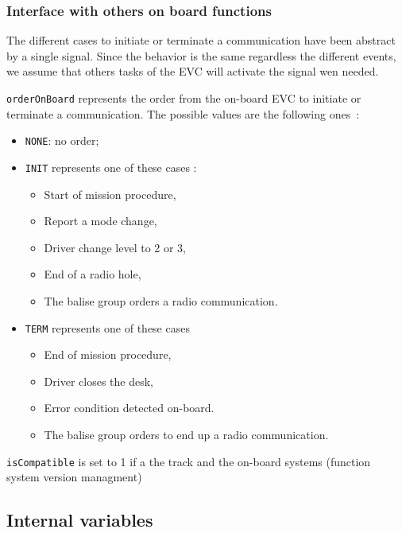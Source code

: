 \subsubsection{Interface with others on board functions}
The different cases to initiate or terminate a communication have been abstract
by a single signal. Since the behavior is the same regardless the different
events, we assume that others tasks of the EVC will activate the signal wen
needed.

\begin{description}
\item \verb+orderOnBoard+ represents the order from the on-board EVC to initiate
or terminate a communication. The possible values are the following ones~: 
  \begin{itemize}
  \item \verb+NONE+:  no order;
  \item \verb+INIT+ represents one of these cases :
	\begin{itemize}
	\item Start of mission procedure,
	\item Report a mode change,
	\item Driver change level to 2 or 3,
	\item End of a radio hole,
	\item The balise group orders a radio communication.
	\end{itemize}
  \item \verb+TERM+ represents one of these cases
	\begin{itemize}
	\item End of mission procedure, 
	\item Driver closes the desk,
	\item Error condition detected on-board.
	\item The balise group orders to end up a radio communication.
	\end{itemize}
  \end{itemize}
\item \verb+isCompatible+ is set to 1 if a the track and the on-board systems
(function system version managment)
\end{description}

\subsection{Internal variables}
\label{subsec:internalvar}


